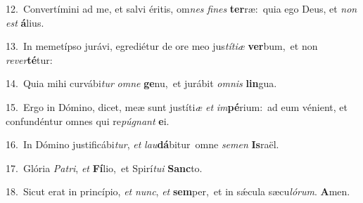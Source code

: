 {\numbfont\textcolor{\numbcolor}{12.}}~Convertímini ad me, et salvi éritis, om\textit{nes} \textit{fi}\-\textit{nes} \textbf{ter}\-ræ:~\star quia ego Deus, et \textit{non} \textit{est} \textbf{á}\-lius.\par
{\numbfont\textcolor{\numbcolor}{13.}}~In memetípso jurávi, egrediétur de ore meo jus\-\textit{tí}\-\textit{ti}\textit{æ} \textbf{ver}\-bum,~\star et non \textit{re}\-\textit{ver}\textbf{té}tur:\par
{\numbfont\textcolor{\numbcolor}{14.}}~Quia mihi curvábi\textit{tur} \textit{om}\-\textit{ne} \textbf{ge}\-nu,~\star et jurábit \textit{om}\-\textit{nis} \textbf{lin}\-gua.\par
{\numbfont\textcolor{\numbcolor}{15.}}~Ergo in Dómino, dicet, meæ sunt justíti\textit{æ} \textit{et} \textit{im}\-\textbf{pé}rium:~\star ad eum vénient, et confundéntur omnes qui re\-\textit{pú}\-\textit{gnant} \textbf{e}\-i.\par
{\numbfont\textcolor{\numbcolor}{16.}}~In Dómino justificábi\-\textit{tur}\-, \textit{et} \textit{lau}\-\textbf{dá}bitur~\star omne \textit{se}\-\textit{men} \textbf{Is}\-raël.\par
{\numbfont\textcolor{\numbcolor}{17.}}~Glória \textit{Pa}\-\textit{tri}, \textit{et} \textbf{Fí}\-lio,~\star et Spirí\-\textit{tu}\-\textit{i} \textbf{Sanc}\-to.\par
{\numbfont\textcolor{\numbcolor}{18.}}~Sicut erat in princípio, \textit{et} \textit{nunc}\-, \textit{et} \textbf{sem}\-per,~\star et in sǽcula sæcu\-\textit{ló}\-\textit{rum}. \textbf{A}\-men.\par
